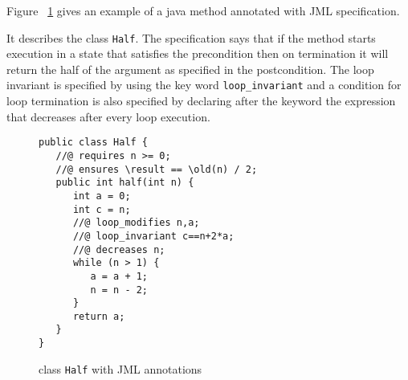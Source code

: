 Figure ~\ref{halfSrc} gives an example of a java method annotated with JML specification.

It describes the class \texttt{Half}.
The specification says that if the method starts execution in a state that satisfies the precondition then on termination it will return the half of the argument as specified in the postcondition. The loop invariant is specified by using the key word \texttt{loop\_invariant} and a condition for loop termination is also specified by declaring after the keyword  the expression that decreases after every loop execution. 
\begin{figure}[ht!]
\begin{verbatim}
public class Half {	
   //@ requires n >= 0;
   //@ ensures \result == \old(n) / 2; 	 
   public int half(int n) {
      int a = 0;
      int c = n;
      //@ loop_modifies n,a;
      //@ loop_invariant c==n+2*a;
      //@ decreases n;
      while (n > 1) {
         a = a + 1;
         n = n - 2;
      }
      return a;
   }
} 
\end{verbatim}
\caption{class \texttt{Half} with JML annotations} 
\label{halfSrc}
\end{figure}
